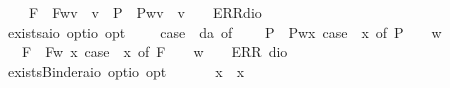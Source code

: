 \begin{isabellebody}
\ \ \ \ F{\isacharparenleft}{\isasympsi}{\isacharparenright}\ {\isasymRightarrow}\ F{\isacharparenleft}{\isasymlambda}w{\isachardot}{\isasymexists}v{\isachardot}\ {\isasympsi}\ v{\isacharparenright}\ {\isacharbar}\ P{\isacharparenleft}{\isasympsi}{\isacharparenright}\ {\isasymRightarrow}\ P{\isacharparenleft}{\isasymlambda}w{\isachardot}{\isasymexists}v{\isachardot}\ {\isasympsi}\ v{\isacharparenright}\ {\isacharbar}\ {\isacharunderscore}\ {\isasymRightarrow}\ ERR{\isacharparenleft}dio{\isacharparenright}{\isachardoublequoteclose}\isanewline
\isanewline
\ \isamarkupfalse%
\ exists{\isacharcolon}{\isacharcolon}{\isachardoublequoteopen}{\isacharparenleft}{\isacharprime}a{\isasymRightarrow}io\ opt{\isacharparenright}{\isasymRightarrow}io\ opt{\isachardoublequoteclose}\ {\isacharparenleft}{\isachardoublequoteopen}\isactrlbold {\isasymexists}{\isachardoublequoteclose}{\isacharparenright}\ \ {\isachardoublequoteopen}\isactrlbold {\isasymexists}{\isasymPhi}\ {\isasymequiv}\ case\ {\isacharparenleft}{\isasymPhi}\ da{\isacharparenright}\ of\isanewline
\ \ \ \ P{\isacharparenleft}{\isacharunderscore}{\isacharparenright}\ {\isasymRightarrow}\ P{\isacharparenleft}{\isasymlambda}w{\isachardot}{\isasymexists}x{\isachardot}\ case\ {\isacharparenleft}{\isasymPhi}\ x{\isacharparenright}\ of\ P\ {\isasympsi}\ {\isasymRightarrow}\ {\isasympsi}\ w{\isacharparenright}\ \isanewline
\ \ {\isacharbar}\ F{\isacharparenleft}{\isacharunderscore}{\isacharparenright}\ {\isasymRightarrow}\ F{\isacharparenleft}{\isasymlambda}w{\isachardot}\ {\isasymexists}x{\isachardot}\ case\ {\isacharparenleft}{\isasymPhi}\ x{\isacharparenright}\ of\ F\ {\isasympsi}\ {\isasymRightarrow}\ {\isasympsi}\ w{\isacharparenright}\ {\isacharbar}\ {\isacharunderscore}\ {\isasymRightarrow}\ ERR\ dio{\isachardoublequoteclose}\ \isanewline
\ \isamarkupfalse%
\ existsBinder{\isacharcolon}{\isacharcolon}{\isachardoublequoteopen}{\isacharparenleft}{\isacharprime}a{\isasymRightarrow}io\ opt{\isacharparenright}{\isasymRightarrow}io\ opt{\isachardoublequoteclose}\ {\isacharparenleft}\ {\isachardoublequoteopen}\isactrlbold {\isasymexists}{\isachardoublequoteclose}\ {\isacharbrackleft}{}{\isacharbrackright}\ {}{\isacharparenright}\ \ \ {\isachardoublequoteopen}\isactrlbold {\isasymexists}x{\isachardot}\ {\isasymphi}\ x\ {\isasymequiv}\ \isactrlbold {\isasymexists}{\isasymphi}{\isachardoublequoteclose}%
\isamarkuptrue%
%
\begin{isamarkuptext}%

\end{isamarkuptext}
\end{isabellebody}
